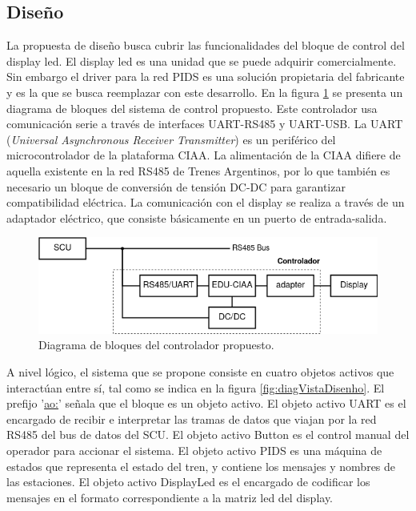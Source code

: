 \subsection{Diseño}
La propuesta de diseño busca cubrir las funcionalidades del bloque de control del display led. El display led es una unidad que se puede adquirir comercialmente. Sin embargo el driver para la red PIDS es una solución propietaria del fabricante y es la que se busca reemplazar con este desarrollo. En la figura \ref{fig:diagVistaReDisenhoEduCIAA} se presenta un diagrama de bloques del sistema de control propuesto. Este controlador usa comunicación serie a través de interfaces UART-RS485 y UART-USB. La UART (\textit{Universal Asynchronous Receiver Transmitter}) es un periférico del microcontrolador de la plataforma CIAA. La alimentación de la CIAA difiere de aquella existente en la red RS485 de Trenes Argentinos, por lo que también es necesario un bloque de conversión de tensión DC-DC para garantizar compatibilidad eléctrica. La comunicación con el display se realiza a través de un adaptador eléctrico, que consiste básicamente en un puerto de entrada-salida.\\


\begin{figure}[ht]
	\centering
	\includegraphics[width=1\textwidth]{./Figures/diagVistaReDisenhoEduCIAA.png}
	\caption{Diagrama de bloques del controlador propuesto.}
	\label{fig:diagVistaReDisenhoEduCIAA}
\end{figure}

A nivel lógico, el sistema que se propone consiste en cuatro objetos activos que interactúan entre sí, tal como se indica en la figura \ref{fig:diagVistaDisenho}. El prefijo '\underline{ao:}' señala que el bloque es un objeto activo. El objeto activo UART es el encargado de recibir e interpretar las tramas de datos que viajan por la red RS485 del bus de datos del SCU. El objeto activo Button es el control manual del operador para accionar el sistema. El objeto activo PIDS es una máquina de estados que representa el estado del tren, y contiene los mensajes y nombres de las estaciones. El objeto activo DisplayLed es el encargado de codificar los mensajes en el formato correspondiente a la matriz led del display.\\


